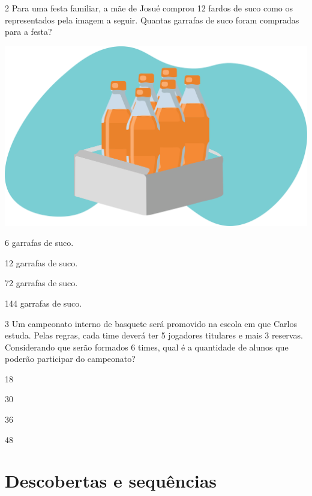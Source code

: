 \num{2} Para uma festa familiar, a mãe de Josué comprou 12 fardos de
suco como os representados pela imagem a seguir. Quantas garrafas de suco foram compradas para a festa? 

\begin{minipage}{.5\textwidth}
\includegraphics[width=\textwidth]{./media/image26.png}
\end{minipage}
\begin{minipage}{.5\textwidth}
\begin{escolha}
\item
  6 garrafas de suco.
\item
  12 garrafas de suco.
\item
  72 garrafas de suco.
\item
  144 garrafas de suco.
\end{escolha}
\end{minipage}

\num{3} Um campeonato interno de basquete será promovido na escola em que Carlos
estuda. Pelas regras, cada time deverá ter 5 jogadores titulares e mais 3 reservas. Considerando que serão formados 6 times, qual é a quantidade de alunos que poderão participar do campeonato?

\begin{escolha}
\item
  18
\item
  30
\item
  36
\item
  48
\end{escolha}

\chapter{Descobertas e sequências}
\enlargethispage{\baselineskip}


